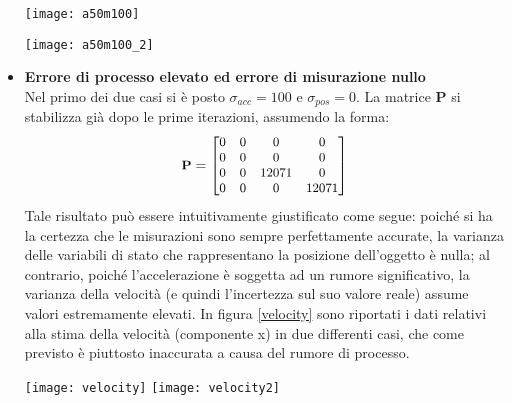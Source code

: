 \begin{itemize}
\begin{minipage}{\linewidth}
	\centering
	\texttt{[image: a50m100]}
\end{minipage}

\begin{minipage}{\linewidth}
	\centering
	\texttt{[image: a50m100\_2]}
\end{minipage}

\newpage

\item \textbf{Errore di processo elevato ed errore di misurazione nullo}\\
Nel primo dei due casi si è posto $\sigma_{acc} = 100$ e $\sigma_{pos} = 0$. La matrice \textbf{P} si stabilizza già dopo le prime iterazioni, assumendo la forma:
\begin{equation*}
\small
\textbf{P} = 
\begin{bmatrix}
0 & 0 & 0 & 0 \\
0 & 0 & 0 & 0 \\
0 & 0 & 12071 & 0 \\
0 & 0 & 0 & 12071 \\
\end{bmatrix}
\end{equation*}
Tale risultato può essere intuitivamente giustificato come segue: poiché si ha la certezza che le misurazioni sono sempre perfettamente accurate, la varianza delle variabili di stato che rappresentano la posizione dell'oggetto è nulla; al contrario, poiché l'accelerazione è soggetta ad un rumore significativo, la varianza della velocità (e quindi l'incertezza sul suo valore reale) assume valori estremamente elevati. In figura \ref{velocity} sono riportati i dati relativi alla stima della velocità (componente x) in due differenti casi, che come previsto è piuttosto inaccurata a causa del rumore di processo.

\begin{minipage}{\linewidth}
	\centering
	\texttt{[image: velocity]}
	\texttt{[image: velocity2]}
	\label{velocity}
\end{minipage}

\newpage


\end{itemize}
